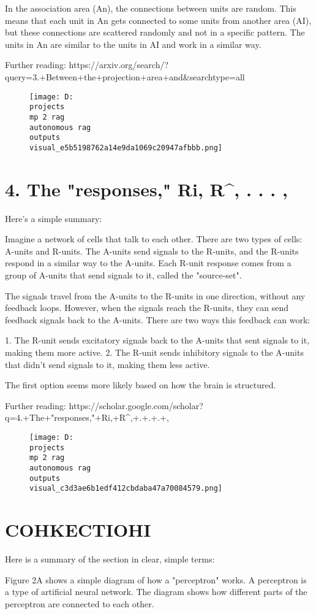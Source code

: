 \documentclass[12pt,a4paper]{article}
\begin{document}
In the association area (An), the connections between units are random. This means that each unit in An gets connected to some units from another area (AI), but these connections are scattered randomly and not in a specific pattern. The units in An are similar to the units in AI and work in a similar way.

Further reading: https://arxiv.org/search/?query=3.+Between+the+projection+area+and&searchtype=all
\begin{figure}[h]
\centering
\texttt{[image: D:\\projects\\mp 2 rag\\autonomous rag\\outputs\\visual\_e5b5198762a14e9da1069c20947afbbb.png]}
\end{figure}
\section{4. The "responses," Ri, R^, . . . ,}
Here's a simple summary:

Imagine a network of cells that talk to each other. There are two types of cells: A-units and R-units. The A-units send signals to the R-units, and the R-units respond in a similar way to the A-units. Each R-unit response comes from a group of A-units that send signals to it, called the "source-set".

The signals travel from the A-units to the R-units in one direction, without any feedback loops. However, when the signals reach the R-units, they can send feedback signals back to the A-units. There are two ways this feedback can work:

1. The R-unit sends excitatory signals back to the A-units that sent signals to it, making them more active.
2. The R-unit sends inhibitory signals to the A-units that didn't send signals to it, making them less active.

The first option seems more likely based on how the brain is structured.

Further reading: https://scholar.google.com/scholar?q=4.+The+"responses,"+Ri,+R^,+.+.+.+,
\begin{figure}[h]
\centering
\texttt{[image: D:\\projects\\mp 2 rag\\autonomous rag\\outputs\\visual\_c3d3ae6b1edf412cbdaba47a70084579.png]}
\end{figure}
\section{COHKECTIOHI}
Here is a summary of the section in clear, simple terms:

Figure 2A shows a simple diagram of how a "perceptron" works. A perceptron is a type of artificial neural network. The diagram shows how different parts of the perceptron are connected to each other.
\end{document}
